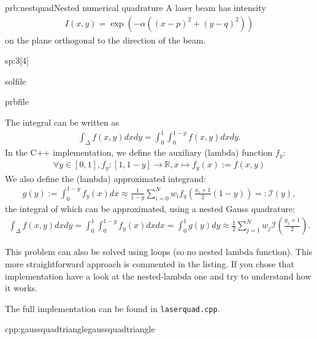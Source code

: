 \begin{samproblem}{prb:nestquad}{Nested numerical quadrature}{
  A laser beam has intensity
  \begin{align*}
    I(x,y) = \exp(- \alpha ((x-p)^2 + (y-q)^2) )
  \end{align*}
  on the plane orthogonal to the direction of the beam.
}
\begin{subproblem}{sp:3}[4]
  
  \begin{samwriteprbpart}{solfile}
    \begin{writeverbatim}{prbfile}
      \begin{samsolution}
        The integral can be written as
        \begin{align*}
          \int_\Delta f(x,y) dx dy = \int_0^1 \int_0^{1-y} f(x,y) dx dy.
        \end{align*}
        In the C++ implementation, we define the auxiliary (lambda) function $f_y$:
        \begin{align*}
          \forall y \in [0,1], f_y: [1,1-y] \rightarrow \mathbb{R}, x \mapsto f_y(x) := f(x,y)
        \end{align*}
        We also define the (lambda) approximated integrand:
        \begin{align}
          g(y) := \int_0^{1-y} f_y(x) dx \approx \frac{1}{1-y} \sum_{i = 0}^N w_i f_y\left(\frac{x_i + 1}{2}  (1-y)\right) =: \mathcal{I}(y),
        \end{align}
        the integral of which can be approximated, using a nested Gauss quadrature:
        \begin{align}
          \int_\Delta f(x,y) dx dy  = \int_0^1  \int_0^{1-y} f_y(x) dx dx = \int_0^1 g(y) dy \approx \frac{1}{2} \sum_{j = 1}^N w_j \mathcal{I}\left(\frac{y_j + 1}{2}\right).
        \end{align}

        This problem can also be solved using loops (so no nested lambda function).
        This more straightforward approach is commented in the listing.
        If you chose that implementation have a look at the nested-lambda one and try to understand how it works.

        The full implementation can be found in \verb|laserquad.cpp|.

        \begin{samcode}[C++-code]{cpp:gaussquadtriangle}{gaussquadtriangle}
          \small
        \end{samcode}
      \end{samsolution}
    \end{writeverbatim}
  \end{samwriteprbpart}

\end{subproblem}


\end{samproblem}

